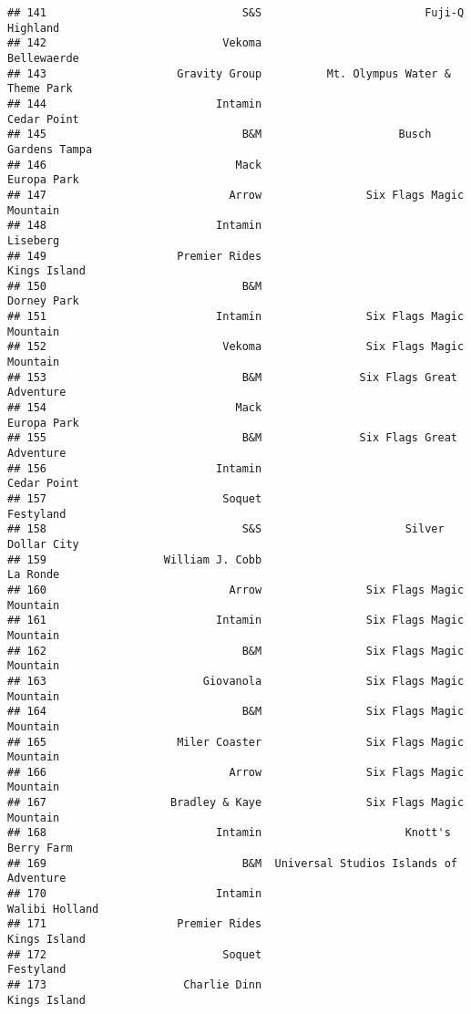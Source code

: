 \documentclass[
]{article}
\begin{document}
\begin{verbatim}
## 141                              S&S                         Fuji-Q Highland
## 142                           Vekoma                             Bellewaerde
## 143                    Gravity Group          Mt. Olympus Water & Theme Park
## 144                          Intamin                             Cedar Point
## 145                              B&M                     Busch Gardens Tampa
## 146                             Mack                             Europa Park
## 147                            Arrow                Six Flags Magic Mountain
## 148                          Intamin                                Liseberg
## 149                    Premier Rides                            Kings Island
## 150                              B&M                             Dorney Park
## 151                          Intamin                Six Flags Magic Mountain
## 152                           Vekoma                Six Flags Magic Mountain
## 153                              B&M               Six Flags Great Adventure
## 154                             Mack                             Europa Park
## 155                              B&M               Six Flags Great Adventure
## 156                          Intamin                             Cedar Point
## 157                           Soquet                               Festyland
## 158                              S&S                      Silver Dollar City
## 159                  William J. Cobb                                La Ronde
## 160                            Arrow                Six Flags Magic Mountain
## 161                          Intamin                Six Flags Magic Mountain
## 162                              B&M                Six Flags Magic Mountain
## 163                        Giovanola                Six Flags Magic Mountain
## 164                              B&M                Six Flags Magic Mountain
## 165                    Miler Coaster                Six Flags Magic Mountain
## 166                            Arrow                Six Flags Magic Mountain
## 167                   Bradley & Kaye                Six Flags Magic Mountain
## 168                          Intamin                      Knott's Berry Farm
## 169                              B&M  Universal Studios Islands of Adventure
## 170                          Intamin                          Walibi Holland
## 171                    Premier Rides                            Kings Island
## 172                           Soquet                               Festyland
## 173                     Charlie Dinn                            Kings Island

\end{verbatim}
\end{document}
